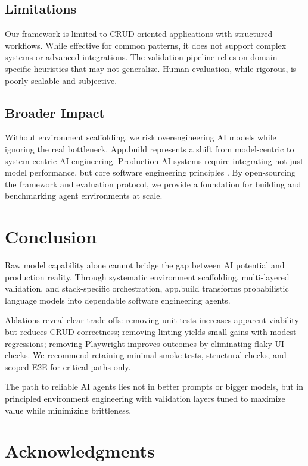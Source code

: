 \documentclass{article}
\begin{document}
\subsection{Limitations}
\label{sec:limitations}

Our framework is limited to CRUD-oriented applications with structured workflows. While effective for common patterns, it does not support complex systems or advanced integrations. The validation pipeline relies on domain-specific heuristics that may not generalize. Human evaluation, while rigorous, is poorly scalable and subjective.

\subsection{Broader Impact}
\label{sec:broader-impact}

Without environment scaffolding, we risk overengineering AI models while ignoring the real bottleneck. App.build represents a shift from model-centric to system-centric AI engineering. Production AI systems require integrating not just model performance, but core software engineering principles \citep{babushkin2025machine}. By open-sourcing the framework and evaluation protocol, we provide a foundation for building and benchmarking agent environments at scale.

\section{Conclusion}
\label{sec:conclusion}

Raw model capability alone cannot bridge the gap between AI potential and production reality. Through systematic environment scaffolding, multi-layered validation, and stack-specific orchestration, app.build transforms probabilistic language models into dependable software engineering agents.

Ablations reveal clear trade-offs: removing unit tests increases apparent viability but reduces CRUD correctness; removing linting yields small gains with modest regressions; removing Playwright improves outcomes by eliminating flaky UI checks. We recommend retaining minimal smoke tests, structural checks, and scoped E2E for critical paths only.

The path to reliable AI agents lies not in better prompts or bigger models, but in principled environment engineering with validation layers tuned to maximize value while minimizing brittleness.

\section*{Acknowledgments}
\end{document}

